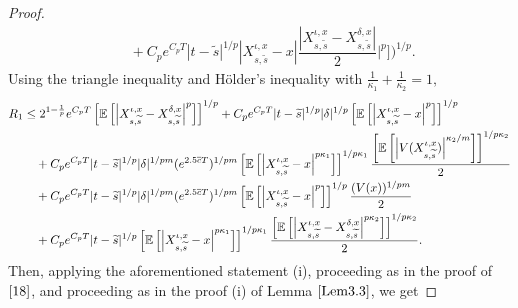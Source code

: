 \documentclass[11pt]{article}
\theoremstyle{theorem}
\theoremstyle{definition}
\newcommand{\bR}{\mathbb{R}}
\newcommand{\1}{{\bf 1}}
\begin{document}
\begin{proof}
\begin{align*}
& \quad  + C_p e^{C_p T} |t-\widetilde{s}|^{1/p} |X_{s, \widetilde{s}}^{\iota, x}-x| \dfrac{|X_{s, \widetilde{s}}^{\iota, x}-X_{s, \widetilde{s}}^{\delta, x}|}{2}   \Bigg|^p\Bigg]\Bigg)^{1/p}.
 \end{align*}
Using the triangle inequality and H\"older's inequality with $\frac{1}{\kappa_1}+\frac{1}{\kappa_2}=1,$
\begin{align*}
R_1 & \leq 2^{1-\frac{1}{p}} e^{C_p T}  \left[\mathbb{E}\left[\left|X^{\iota, x}_{s,\widetilde{s}}-X^{\delta,x}_{s,\widetilde{s}}\right|^p\right]\right]^{1/p}  + C_p e^{C_p T} |t-\widetilde{s}|^{1/p}   |\delta|^{1/p} \left[\mathbb{E}\left[\left|X^{\iota, x}_{s,\widetilde{s}} - x \right|^p\right]\right]^{1/p}  \notag\\
& \quad + C_p e^{C_p T} |t-\widetilde{s}|^{1/p} |\delta|^{1/pm} (e^{2.5\overline{c}T})^{1/pm} \left[\mathbb{E}\left[ \left|X^{\iota, x}_{s,\widetilde{s}} - x \right|^{p\kappa_1}\right]\right]^{1/p\kappa_1} \dfrac{   \left[\mathbb{E}\left[ \left|V(X^{\iota, x}_{s,\widetilde{s}}) \right|^{\kappa_2 /m}\right]\right]^{1/p\kappa_2}}{2} \notag\\
&\quad + C_p e^{C_p T} |t-\widetilde{s}|^{1/p} |\delta|^{1/pm} (e^{2.5\overline{c}T})^{1/pm} \left[\mathbb{E}\left[\left|X^{\iota, x}_{s,\widetilde{s}} - x \right|^{p}\right]\right]^{1/p} \dfrac{   (V(x))^{1/pm}}{2}\notag\\
  & \quad   +  C_p e^{C_p T} |t-\widetilde{s}|^{1/p}  \left[\mathbb{E}\left[\left|X^{\iota, x}_{s,\widetilde{s}} - x\right|^{p\kappa_1}\right]\right]^{1/p\kappa_1}\dfrac{\left[\mathbb{E}\left[ \left|X^{\iota, x}_{s,\widetilde{s}} - X^{\delta, x}_{s,\widetilde{s}}\right|^{p\kappa_2}\right]\right]^{1/p\kappa_2}}{2} .
  \end{align*}
Then, applying the aforementioned statement (i), proceeding as in the proof of $\eqref{18}$, and proceeding as in the proof (i) of Lemma $\ref{Lem3.3}$, we get

\end{proof}
\end{document}
